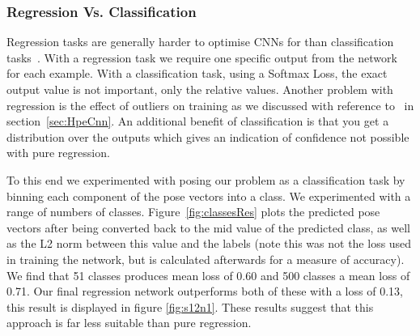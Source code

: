 \documentclass[11pt]{article} %
\begin{document}
\subsubsection{Regression Vs. Classification}

Regression tasks are generally harder to optimise CNNs for than classification tasks~\cite{KarLects}. With a regression task we require one specific output from the network for each example. With a classification task, using a Softmax Loss, the exact output value is not important, only the relative values. Another problem with regression is the effect of outliers on training as we discussed with reference to~\cite{Belagiannis} in section~\ref{sec:HpeCnn}. An additional benefit of classification is that you get a distribution over the outputs which gives an indication of confidence not possible with pure regression. 

To this end we experimented with posing our problem as a classification task by binning each component of the pose vectors into a class. We experimented with a range of numbers of classes. Figure~\ref{fig:classesRes} plots the predicted pose vectors after being converted back to the mid value of the predicted class, as well as the L2 norm between this value and the labels (note this was not the loss used in training the network, but is calculated afterwards for a measure of accuracy). We find that 51 classes produces mean loss of 0.60 and 500 classes a mean loss of 0.71. Our final regression network outperforms both of these with a loss of 0.13, this result is displayed in figure \ref{fig:s12n1}. These results suggest that this approach is far less suitable than pure regression. 
\end{document}

